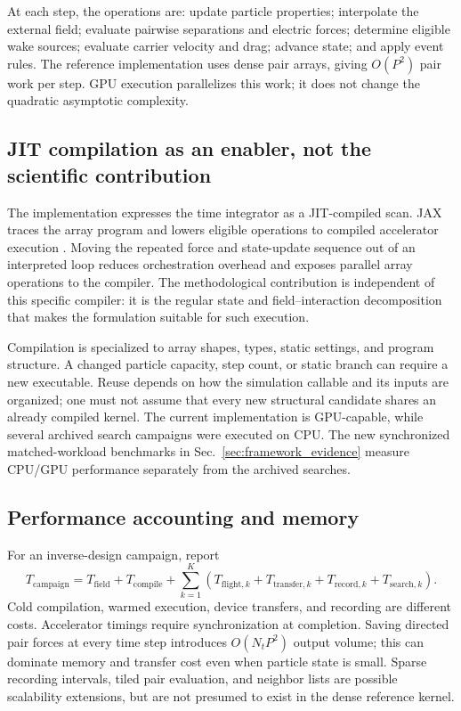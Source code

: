 At each step, the operations are: update particle properties; interpolate the external field; evaluate pairwise separations and electric forces; determine eligible wake sources; evaluate carrier velocity and drag; advance state; and apply event rules. The reference implementation uses dense pair arrays, giving $O(P^2)$ pair work per step. GPU execution parallelizes this work; it does not change the quadratic asymptotic complexity.

\subsection{JIT compilation as an enabler, not the scientific contribution}
The implementation expresses the time integrator as a JIT-compiled scan. JAX traces the array program and lowers eligible operations to compiled accelerator execution \citep{jax,jaxjit}. Moving the repeated force and state-update sequence out of an interpreted loop reduces orchestration overhead and exposes parallel array operations to the compiler. The methodological contribution is independent of this specific compiler: it is the regular state and field--interaction decomposition that makes the formulation suitable for such execution.

Compilation is specialized to array shapes, types, static settings, and program structure. A changed particle capacity, step count, or static branch can require a new executable. Reuse depends on how the simulation callable and its inputs are organized; one must not assume that every new structural candidate shares an already compiled kernel. The current implementation is GPU-capable, while several archived search campaigns were executed on CPU. The new synchronized matched-workload benchmarks in Sec.~\ref{sec:framework_evidence} measure CPU/GPU performance separately from the archived searches.

\subsection{Performance accounting and memory}
For an inverse-design campaign, report
\begin{equation}
 T_{\mathrm{campaign}}=T_{\mathrm{field}}+T_{\mathrm{compile}}+
    \sum_{k=1}^K\left(T_{\mathrm{flight},k}+T_{\mathrm{transfer},k}
                           +T_{\mathrm{record},k}+T_{\mathrm{search},k}\right).
\end{equation}
Cold compilation, warmed execution, device transfers, and recording are different costs. Accelerator timings require synchronization at completion. Saving directed pair forces at every time step introduces $O(N_tP^2)$ output volume; this can dominate memory and transfer cost even when particle state is small. Sparse recording intervals, tiled pair evaluation, and neighbor lists are possible scalability extensions, but are not presumed to exist in the dense reference kernel.

